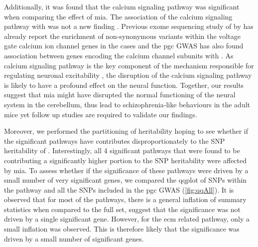 \documentclass[12pt]{scrbook}
\newcommand*{\glng}{\glsentrylong}
\begin{document}
Additionally, it was found that the calcium signaling pathway was significant when comparing the effect of \gls{mia}. 
The association of the calcium signaling pathway with \glng{scz} was not a new finding \citep{Lidow2003,Purcell2014,Ripke2014}.
Previous exome sequencing study of \glng{scz} by \citet{Purcell2014} has already report the enrichment of non-synonymous variants within the voltage gate calcium ion channel genes in the \glng{scz} cases and the \gls{pgc} \glng{scz} \gls{GWAS} has also found association between genes encoding the calcium channel subunits with \glng{scz}.
As calcium signaling pathway is the key component of the mechanism responsible for regulating neuronal excitability \citep{Berridge2014}, the disruption of the calcium signaling pathway is likely to have a profound effect on the neural function. 
Together, our results suggest that \gls{mia} might have disrupted the normal functioning of the neural system in the cerebellum, thus lead to schizophrenia-like behaviours in the adult mice yet follow up studies are required to validate our findings.


Moreover, we performed the partitioning of heritability hoping to see whether if the significant pathways have contributes disproportionately to the \gls{SNP} heritability of \glng{scz}.
Interestingly, all 4 significant pathways that were found to be contributing a significantly higher portion to the \gls{SNP} heritability were affected by \gls{mia}.
To assess whether if the significance of these pathways were driven by a small number of very significant genes, we compared the \gls{qqplot} of \glspl{SNP} within the pathway and all the \glspl{SNP} included in the \gls{pgc} \gls{GWAS} (\cref{fig:qqAll}).
It is observed that for most of the pathways, there is a general inflation of summary statistics when compared to the full set, suggest that the significance was not driven by a single significant gene.
However, for the \gls{ecm} related pathway, only a small inflation was observed. 
This is therefore likely that the significance was driven by a small number of significant genes. 
\end{document}

